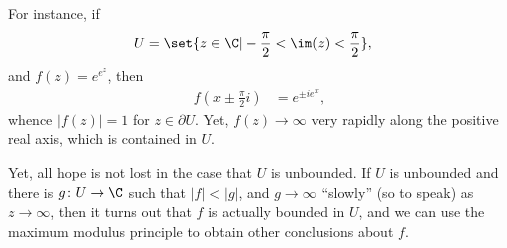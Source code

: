 \documentclass[10pt]{mypackage}
\begin{document}
For instance, if
\begin{align*}
  U &= \set{z\in \C | -\frac{\pi}{2} < \im(z) < \frac{\pi}{2}},
\end{align*}
and $f(z) = e^{e^{z}}$, then 
\begin{align*}
  f\left( x \pm \frac{\pi}{2}i \right) &= e^{\pm ie^{x}},
\end{align*}
whence $\left\vert f(z) \right\vert = 1$ for $z\in \partial U$. Yet, $f(z)\rightarrow \infty$ very rapidly along the positive real axis, which is contained in $U$.%

Yet, all hope is not lost in the case that $U$ is unbounded. If $U$ is unbounded and there is $g\colon U\rightarrow \C$  such that $\left\vert f \right\vert < \left\vert g \right\vert$, and $g\rightarrow\infty$ ``slowly'' (so to speak) as $z\rightarrow\infty$, then it turns out that $f$ is actually bounded in $U$, and we can use the maximum modulus principle to obtain other conclusions about $f$.%
\end{document}
